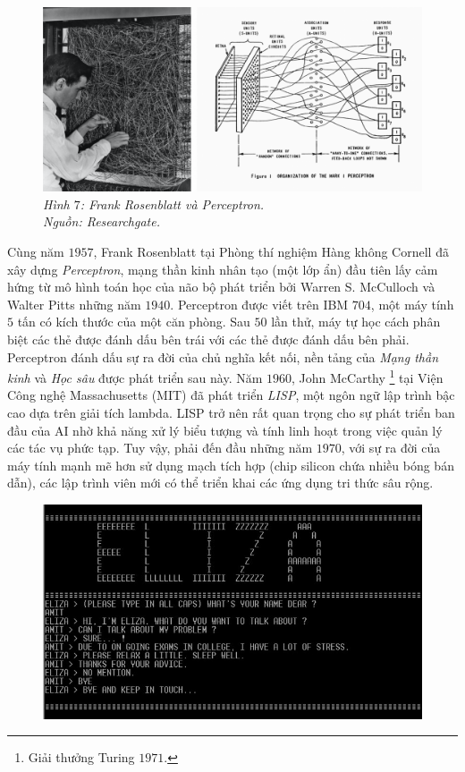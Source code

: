 \begin{multicols}{2}
	\begin{figure}[H]
		\vspace*{-5pt}
		\centering
		\captionsetup{labelformat= empty, justification=centering}
		\includegraphics[width= 1\linewidth]{perceptron_1.png}
		\caption{\small\textit{\color{timhieukhoahoc}Hình $7$: Frank Rosenblatt và Perceptron.\\ Nguồn: Researchgate.}}
		\vspace*{-10pt}
	\end{figure}
	Cùng năm $1957$, Frank Rosenblatt tại Phòng thí nghiệm Hàng không Cornell đã xây dựng \textit{Perceptron}, mạng thần kinh nhân tạo (một lớp ẩn) đầu tiên lấy cảm hứng từ mô hình toán học của não bộ phát triển bởi Warren S. McCulloch và Walter Pitts những năm $1940$. Perceptron được viết trên IBM $704$, một máy tính $5$ tấn có kích thước của một căn phòng. Sau $50$ lần thử, máy tự học cách phân biệt các thẻ được đánh dấu bên trái với các thẻ được đánh dấu bên phải. Perceptron đánh dấu sự ra đời của chủ nghĩa kết nối, nền tảng của \textit{Mạng thần kinh}  và \textit{Học sâu} được phát triển sau này.
	\vskip 0.1cm
	Năm $1960$, John McCarthy \footnote{\color{timhieukhoahoc}Giải thưởng Turing $1971$.} tại Viện Công nghệ Massachusetts (MIT) đã phát triển \textit{LISP}, một ngôn ngữ lập trình bậc cao dựa trên giải tích lambda. LISP trở nên rất quan trọng cho sự phát triển ban đầu của AI nhờ khả năng xử lý biểu tượng và tính linh hoạt trong việc quản lý các tác vụ phức tạp. Tuy vậy, phải đến đầu những năm $1970$, với sự ra đời của máy tính mạnh mẽ hơn sử dụng mạch tích hợp (chip silicon chứa nhiều bóng bán dẫn), các lập trình viên mới có thể triển khai các ứng dụng tri thức sâu rộng.
	\begin{figure}[H]
		\vspace*{-5pt}
		\centering
		\captionsetup{labelformat= empty, justification=centering}
		\includegraphics[width= 1\linewidth]{eliza.jpeg}

\end{figure}
\end{multicols}
